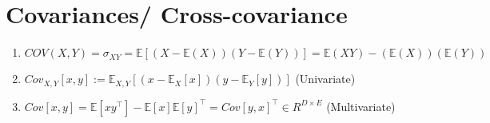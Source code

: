 \section{Covariances/ Cross-covariance \cite{ism-1}} \label{Multivariate Distributions: Covariances/ Cross-covariance}

\begin{enumerate}
    \item $
        COV(X, Y) 
        = \sigma_{XY} 
        = \mathbb{E}[(X - \mathbb{E}(X))(Y - \mathbb{E}(Y))] 
        = \mathbb{E}(XY) - (\mathbb{E}(X))(\mathbb{E}(Y))
    $ \hfill \cite{ism-1}

    \item $
        Cov_{X,Y}[x, y] 
        := \mathbb{E}_{X,Y}[(x - \mathbb{E}_X[x])(y - \mathbb{E}_Y[y])]
    $ \hfill (Univariate) \cite{mfml-1}

    \item $
        Cov[x, y] 
        = \mathbb{E}[xy^\top] - \mathbb{E}[x]\mathbb{E}[y]^\top 
        = Cov[y, x]^\top 
        \in R^{D\times E}
    $ \hfill (Multivariate) \cite{mfml-1}

    

\end{enumerate}

